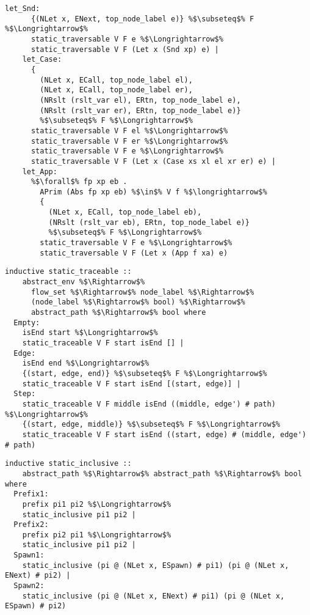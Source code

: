 \documentclass{article}
\begin{document}
\begin{lstlisting}[style=codestyle1, escapechar=\%]
    let_Snd:
      {(NLet x, ENext, top_node_label e)} %$\subseteq$% F %$\Longrightarrow$%
      static_traversable V F e %$\Longrightarrow$%
      static_traversable V F (Let x (Snd xp) e) |
    let_Case:
      {
        (NLet x, ECall, top_node_label el),
        (NLet x, ECall, top_node_label er),
        (NRslt (rslt_var el), ERtn, top_node_label e),
        (NRslt (rslt_var er), ERtn, top_node_label e)}
        %$\subseteq$% F %$\Longrightarrow$%
      static_traversable V F el %$\Longrightarrow$%
      static_traversable V F er %$\Longrightarrow$%
      static_traversable V F e %$\Longrightarrow$%
      static_traversable V F (Let x (Case xs xl el xr er) e) |
    let_App:
      %$\forall$% fp xp eb .
        APrim (Abs fp xp eb) %$\in$% V f %$\longrightarrow$%
        {
          (NLet x, ECall, top_node_label eb),
          (NRslt (rslt_var eb), ERtn, top_node_label e)}
          %$\subseteq$% F %$\Longrightarrow$%
        static_traversable V F e %$\Longrightarrow$%
        static_traversable V F (Let x (App f xa) e)

  \end{lstlisting}

\begin{lstlisting}[style=codestyle1, escapechar=\%]
  inductive static_traceable ::
    abstract_env %$\Rightarrow$%
      flow_set %$\Rightarrow$% node_label %$\Rightarrow$%
      (node_label %$\Rightarrow$% bool) %$\Rightarrow$%
      abstract_path %$\Rightarrow$% bool where
  Empty:
    isEnd start %$\Longrightarrow$%
    static_traceable V F start isEnd [] |
  Edge:
    isEnd end %$\Longrightarrow$%
    {(start, edge, end)} %$\subseteq$% F %$\Longrightarrow$%
    static_traceable V F start isEnd [(start, edge)] |
  Step:
    static_traceable V F middle isEnd ((middle, edge') # path) %$\Longrightarrow$%
    {(start, edge, middle)} %$\subseteq$% F %$\Longrightarrow$%
    static_traceable V F start isEnd ((start, edge) # (middle, edge') # path)
  \end{lstlisting}

\begin{lstlisting}[style=codestyle1, escapechar=\%]
  inductive static_inclusive ::
    abstract_path %$\Rightarrow$% abstract_path %$\Rightarrow$% bool where
  Prefix1:
    prefix pi1 pi2 %$\Longrightarrow$%
    static_inclusive pi1 pi2 |
  Prefix2:
    prefix pi2 pi1 %$\Longrightarrow$%
    static_inclusive pi1 pi2 |
  Spawn1:
    static_inclusive (pi @ (NLet x, ESpawn) # pi1) (pi @ (NLet x, ENext) # pi2) |
  Spawn2:
    static_inclusive (pi @ (NLet x, ENext) # pi1) (pi @ (NLet x, ESpawn) # pi2)
  \end{lstlisting}
\end{document}
